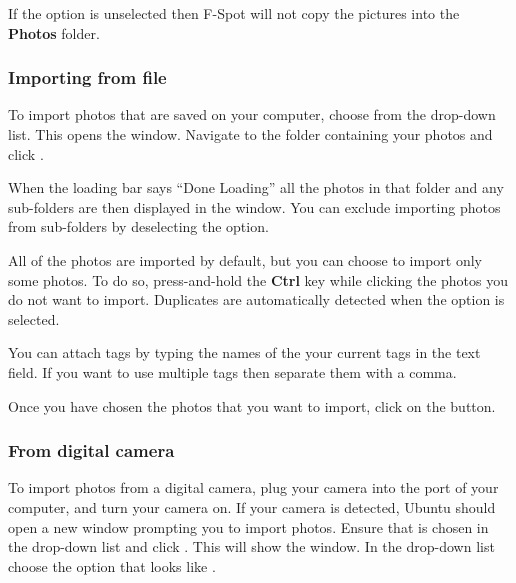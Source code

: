 If the  option is unselected then 
F-Spot will not copy the pictures into the \textbf{Photos} folder.

\subsubsection{Importing from file}



To import photos that are saved on your computer, choose  
from the  drop-down list. This opens the  
window. Navigate to the folder containing your photos and click .

When the loading bar says ``Done Loading'' all the photos in that folder and any 
sub-folders are then displayed in the  window. You can exclude 
importing photos from sub-folders by deselecting the 
 option.

All of the photos are imported by default, but you can choose to import only
some photos. To do so, press-and-hold the \textbf{Ctrl} key while clicking 
the photos you do not want to import. Duplicates are automatically detected when
 the  option is selected.

You can attach tags by typing the names of the your current tags in the 
 text field. If you want to use multiple tags then 
separate them with a comma.

Once you have chosen the photos that you want to import, click on the 
 button.

\subsubsection{From digital camera}

To import photos from a digital camera, plug your camera into the  port of 
your computer, and turn your camera on. If your camera is detected, Ubuntu should 
open a new window prompting you to import photos. Ensure that 
 is chosen in the drop-down list and click . 
This will show the  window. In the  
drop-down list choose the option that looks like .
  
